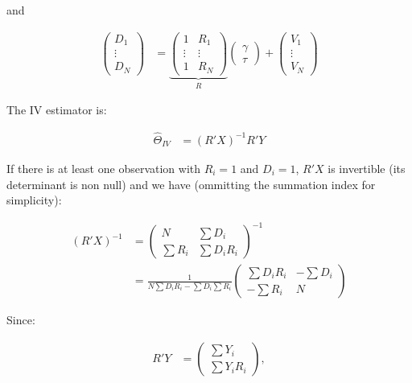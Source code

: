 \documentclass[]{book}
\theoremstyle{definition}
\theoremstyle{definition}
\theoremstyle{definition}
\theoremstyle{remark}
\begin{document}
and

\begin{align*}
  \left(\begin{array}{c}  D_1 \\    \vdots \\   D_N \end{array}\right) & =
  \underbrace{\left(\begin{array}{cc}   1 & R_1\\   \vdots & \vdots\\   1 & R_N\end{array}\right)}_{R}
  \left(\begin{array}{c}    \gamma \\   \tau \end{array}\right)+
  \left(\begin{array}{c}    V_1 \\  \vdots \\   V_N \end{array}\right)
\end{align*}

The IV estimator is:

\begin{align*}
    \hat{\Theta}_{IV} &  = (R'X)^{-1}R'Y
\end{align*}

If there is at least one observation with \(R_i=1\) and \(D_i=1\), \(R'X\) is invertible (its determinant is non null) and we have (ommitting the summation index for simplicity):

\begin{align*}
(R'X)^{-1} &  = \left(\begin{array}{cc} N & \sum D_i \\ \sum R_i & \sum D_iR_i \end{array}\right)^{-1} \\
                & = \frac{1}{N\sum D_iR_i-\sum D_i\sum R_i}\left(\begin{array}{cc} \sum D_iR_i & -\sum D_i \\ -\sum R_i & N \end{array}\right)
\end{align*}

Since:

\begin{align*}
R'Y &  = \left(\begin{array}{c} \sum Y_i \\ \sum Y_iR_i \end{array}\right),
\end{align*}
\end{document}
